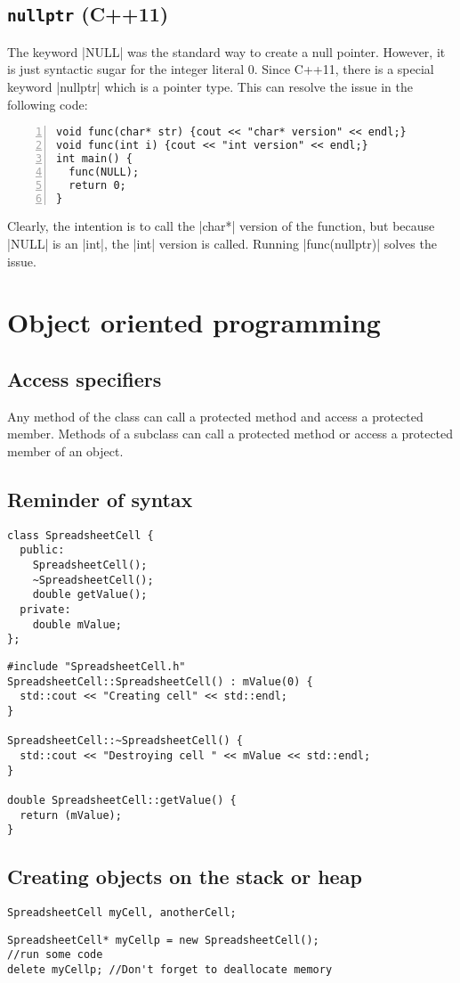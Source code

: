 \documentclass[a4paper,12pt,oneside]{book}
\begin{document}
{\section{\texttt{nullptr} (C++11)}
The keyword \lst|NULL| was the standard way to create a null pointer. However, it is just syntactic sugar for the integer literal 0. Since C++11, there is a special keyword \lst|nullptr| which is a pointer type. This can resolve the issue in the following code:
\begin{lstlisting}[numbers=left]
void func(char* str) {cout << "char* version" << endl;}
void func(int i) {cout << "int version" << endl;}
int main() {
  func(NULL);
  return 0;
}
\end{lstlisting}
Clearly, the intention is to call the \lst|char*| version of the function, but because \lst|NULL| is an \lst|int|, the \lst|int| version is called. Running \lst|func(nullptr)| solves the issue.
\chapter{Object oriented programming}
\section{Access specifiers}
Any method of the class can call a protected method and access a protected member. Methods of a subclass can call a protected method or access a protected member of an object.
\section{Reminder of syntax}
\begin{lstlisting}[caption={SpreadsheetCell.h}]
class SpreadsheetCell {
  public:
    SpreadsheetCell();
    ~SpreadsheetCell();
    double getValue();
  private:
    double mValue;
};
\end{lstlisting}
\begin{lstlisting}[caption={SpreadsheetCell.cpp}]
#include "SpreadsheetCell.h"
SpreadsheetCell::SpreadsheetCell() : mValue(0) {
  std::cout << "Creating cell" << std::endl;
}

SpreadsheetCell::~SpreadsheetCell() {
  std::cout << "Destroying cell " << mValue << std::endl;
}

double SpreadsheetCell::getValue() {
  return (mValue);
}
\end{lstlisting}
\section{Creating objects on the stack or heap}
\begin{lstlisting}[caption={Creating objects on the stack}]
SpreadsheetCell myCell, anotherCell;
\end{lstlisting}
\begin{lstlisting}[caption={Creating objects on the heap}]
SpreadsheetCell* myCellp = new SpreadsheetCell();
//run some code
delete myCellp; //Don't forget to deallocate memory
\end{lstlisting}

}
\end{document}
